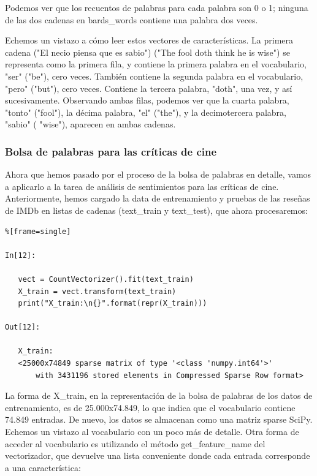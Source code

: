 Podemos ver que los recuentos de palabras para cada palabra son 0 o 1; ninguna de las dos cadenas en {\ttfamily bards\_words} contiene una palabra dos veces.

Echemos un vistazo a cómo leer estos vectores de características. La primera cadena ("{}El necio piensa que es sabio{}") ("{}The fool doth think he is wise"{})  se representa como la primera fila, y contiene la primera palabra en el vocabulario, "{}ser"{} ("{}be"{}), cero veces. También contiene la segunda palabra en el vocabulario, "{}pero"{} ("{}but"{}), cero veces. Contiene la tercera palabra, "{}doth"{}, una vez, y así sucesivamente. Observando ambas filas, podemos ver que la cuarta palabra, "{}tonto"{} ("{}fool"{}), la décima palabra, "{}el"{}  ("{}the"{}), y la decimotercera palabra, "{}sabio"{} ( "{}wise"{}), aparecen en ambas cadenas.

\subsubsection{Bolsa de palabras para las críticas de cine}


Ahora que hemos pasado por el proceso de la bolsa de palabras en detalle, vamos a aplicarlo 
a la tarea de análisis de sentimientos para las críticas de cine. Anteriormente, hemos
 cargado la data de entrenamiento y pruebas de las reseñas de IMDb en listas de cadenas 
 ({\ttfamily text\_train}  y  {\ttfamily  text\_test}), que ahora procesaremos:


\begin{lstlisting}%[frame=single]

In[12]:

   vect = CountVectorizer().fit(text_train)
   X_train = vect.transform(text_train)
   print("X_train:\n{}".format(repr(X_train)))

Out[12]:

   X_train:
   <25000x74849 sparse matrix of type '<class 'numpy.int64'>'
       with 3431196 stored elements in Compressed Sparse Row format>

\end{lstlisting}

La forma de {\ttfamily X\_train}, en la representación de la bolsa de palabras de los datos 
de entrenamiento, es de 25.000x74.849, lo que indica que el vocabulario contiene 74.849 
entradas. De nuevo, los datos se almacenan como una matriz sparse  SciPy. Echemos un 
vistazo al vocabulario con un poco más de detalle. Otra forma de acceder al vocabulario es 
utilizando el método {\ttfamily get\_feature\_name} del vectorizador, que devuelve una lista conveniente 
donde cada entrada corresponde a una característica: 


